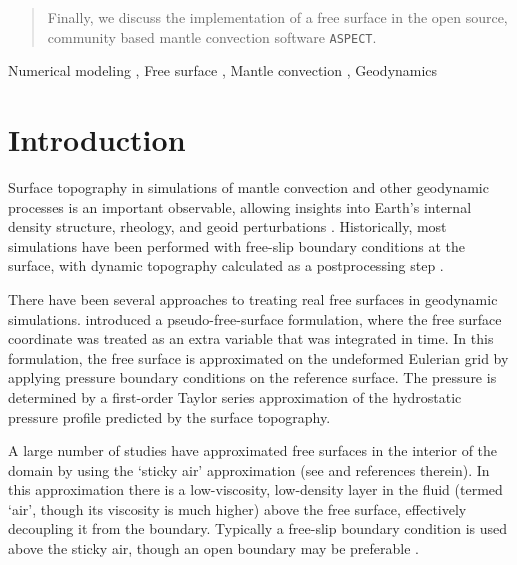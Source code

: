 \documentclass[preprint,12pt,authoryear]{elsarticle}
\begin{document}
\begin{frontmatter}
\begin{abstract}
Finally, we discuss the implementation of a free surface in the open source, community based
mantle convection software \texttt{ASPECT}.
\end{abstract}

\begin{keyword}
Numerical modeling \sep
Free surface \sep
Mantle convection \sep
Geodynamics



\end{keyword}

\end{frontmatter}

\linenumbers


\section{Introduction}
\label{sec:intro}

Surface topography in simulations of mantle convection and other geodynamic processes is an important observable,
allowing insights into Earth's internal density structure, rheology, and geoid perturbations \citep[e.g.][]{richards1984geoid, hager1985lower, baumann2014constraining}.
Historically, most simulations have been performed with free-slip boundary conditions at the surface, 
with dynamic topography calculated as a postprocessing step \citep[e.g.][]{jarvis1982mantle, zhong2000role}.

There have been several approaches to treating real free surfaces in geodynamic simulations.
\citet{zhong1996free} introduced a pseudo-free-surface formulation, where the free surface coordinate was
treated as an extra variable that was integrated in time. In this formulation, the free surface 
is approximated on the undeformed Eulerian grid by applying pressure boundary conditions on the reference surface.
The pressure is determined by a first-order Taylor series approximation of the hydrostatic pressure profile 
predicted by the surface topography.

A large number of studies have approximated free surfaces in the interior of the domain by using the 
`sticky air' approximation (see \citet{crameri2012comparison} and references therein). In this approximation there is a low-viscosity, low-density layer in the fluid 
(termed `air', though its viscosity is much higher) above the free surface, effectively decoupling it from the boundary. 
Typically a free-slip boundary condition is used above the sticky air, though an open boundary may be preferable \citep{hillebrand2014using}. 
\end{document}
